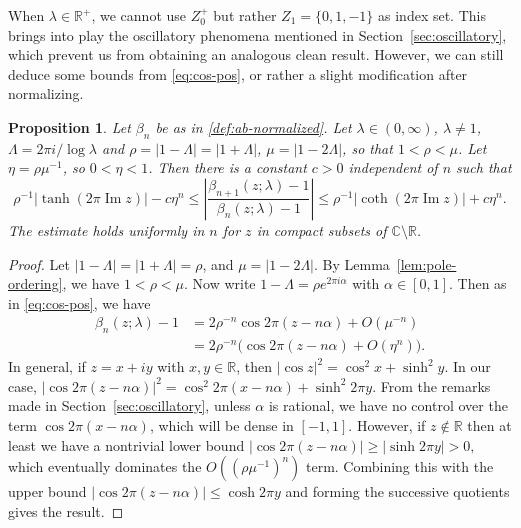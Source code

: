 \documentclass[11pt,a4paper]{amsart}
\newcommand{\R}{\mathbb{R}}
\newcommand{\C}{\mathbb{C}}
\renewcommand{\Im}{\operatorname{Im}}
\theoremstyle{plain}
\newtheorem{prop}[theorem]{Proposition}
\theoremstyle{remark}
\begin{document}
When $\lambda \in \R^{+}$, we cannot use $Z_{0}^{+}$ but rather $Z_{1} = \{0,1,-1\}$ as index set. This brings into play
the oscillatory phenomena mentioned in Section~\ref{sec:oscillatory}, which prevent us from obtaining an analogous clean result. However, we can still deduce some bounds from \eqref{eq:cos-pos}, or rather a slight modification after normalizing. 


\begin{prop}
\label{prop:quot-AB-R+}
Let $\beta_{n}$ be as in \eqref{def:ab-normalized}.
Let $\lambda \in (0,\infty)$, $\lambda \neq 1$, $\Lambda = 2\pi i/\log\lambda$ and
$\rho = |1 - \Lambda| = |1 + \Lambda|$, $\mu = |1 - 2 \Lambda|$, so that $1 < \rho < \mu$. 
Let $\eta = \rho \mu^{-1}$, so $0 < \eta < 1$.
Then there is a constant $c > 0$ independent of $n$ such that
%
\begin{equation}
\label{eq:quot-AB-R+}
         \rho^{-1} |\tanh (2\pi \Im z)| - c \eta^{n}
	\leq \left| \frac{\beta_{n+1}(z;\lambda) - 1}{\beta_{n}(z;\lambda) - 1}\right|
	\leq \rho^{-1} |\coth (2\pi \Im z)| + c \eta^{n}.
\end{equation}
%
The estimate holds uniformly in $n$ for $z$ in compact subsets of $\C \setminus \R$.
\end{prop}


\begin{proof}
Let $|1-\Lambda| = |1+\Lambda| = \rho$, and $\mu = |1 - 2\Lambda|$. By Lemma~\ref{lem:pole-ordering},
we have $1 < \rho < \mu$. Now write $1-\Lambda = \rho e^{2\pi i \alpha}$ with $\alpha \in [0,1]$. Then as in 
\eqref{eq:cos-pos}, we have
$$
\begin{aligned}
   	\beta_{n}(z;\lambda) - 1 &= 2 \rho^{-n}\cos 2\pi(z - n\alpha) + O(\mu^{-n})
							\\
	                         &= 2 \rho^{-n} \bigl( \cos 2\pi(z-n\alpha) + O(\eta^{n}) \bigr).
\end{aligned}
$$
In general, if $z = x + i y$ with $x,y \in \R$, then $|\cos z|^{2} = \cos^{2} x + \sinh^{2} y$. 
In our case,
$
	|\cos 2\pi(z - n\alpha)|^{2} = \cos^{2} 2\pi(x - n\alpha) + \sinh^{2} 2\pi y.
$
From the remarks made in Section~\ref{sec:oscillatory}, unless $\alpha$ is rational, we have no control over the term 
$\cos 2\pi(x-n\alpha)$, which will be dense in $[-1,1]$. However, if $z \notin \R$ then at least we have a nontrivial lower bound
$
	|\cos 2\pi(z - n\alpha)| \geq |\sinh 2\pi y| > 0,
$
which eventually dominates the $O((\rho\mu^{-1})^{n})$ term.
Combining this with the upper bound $|\cos 2\pi(z - n\alpha)| \leq \cosh 2\pi y$ and forming the successive quotients gives the result.
\end{proof}
\end{document}
